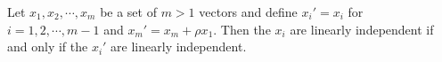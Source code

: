 Let $x_1, x_2, \cdots, x_m$ be a set of $m > 1$ vectors and define $x_i' = x_i$ for $i = 1, 2, \cdots, m-1$ and $x_m' = x_m + \rho x_1$. Then the $x_i$ are linearly independent if and only if the $x_i'$ are linearly independent.
